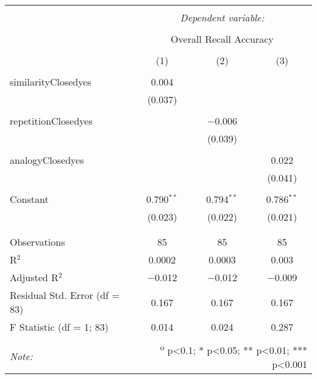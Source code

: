 
\begin{table}[!htbp] \centering 
  \caption{} 
  \label{} 
\begin{tabular}{@{\extracolsep{5pt}}lccc} 
\\[-1.8ex]\hline 
\hline \\[-1.8ex] 
 & \multicolumn{3}{c}{\textit{Dependent variable:}} \\ 
\cline{2-4} 
\\[-1.8ex] & \multicolumn{3}{c}{Overall Recall Accuracy} \\ 
\\[-1.8ex] & (1) & (2) & (3)\\ 
\hline \\[-1.8ex] 
 similarityClosedyes & 0.004 &  &  \\ 
  & (0.037) &  &  \\ 
  & & & \\ 
 repetitionClosedyes &  & $-$0.006 &  \\ 
  &  & (0.039) &  \\ 
  & & & \\ 
 analogyClosedyes &  &  & 0.022 \\ 
  &  &  & (0.041) \\ 
  & & & \\ 
 Constant & 0.790$^{**}$ & 0.794$^{**}$ & 0.786$^{**}$ \\ 
  & (0.023) & (0.022) & (0.021) \\ 
  & & & \\ 
\hline \\[-1.8ex] 
Observations & 85 & 85 & 85 \\ 
R$^{2}$ & 0.0002 & 0.0003 & 0.003 \\ 
Adjusted R$^{2}$ & $-$0.012 & $-$0.012 & $-$0.009 \\ 
Residual Std. Error (df = 83) & 0.167 & 0.167 & 0.167 \\ 
F Statistic (df = 1; 83) & 0.014 & 0.024 & 0.287 \\ 
\hline 
\hline \\[-1.8ex] 
\textit{Note:}  & \multicolumn{3}{r}{\textsuperscript{o} p<0.1; * p<0.05; ** p<0.01; *** p<0.001} \\ 
\end{tabular} 
\end{table} 
